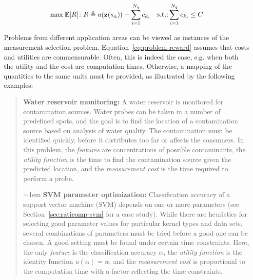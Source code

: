 \begin{equation}
\label{eq:problem-reward}
\mbox{max}\;\mathbb{E}[R]\colon R\triangleq u(\textbf{z}(s_\alpha))-\sum_{i=1}^{N_q}c_{k_i}\quad\mbox{s.t.:}\sum_{i=1}^{N_q}c_{k_i}\le C
\end{equation}

Problems from different application areas can be viewed as instances
of the measurement selection problem. Equation~\ref{eq:problem-reward} assumes
that costs and utilities are commensurable. Often, this is indeed the
case, e.g. when both the utility and the cost are computation
times. Otherwise, a mapping of the quantities to the same units must
be provided, as illustrated by the following examples:

\begin{quote}
{\bf Water reservoir monitoring:} A water reservoir is monitored for
contamination sources. Water probes can be taken in a number of
predefined spots, and the goal is to find the location of a
contamination source based on analysis of water quality. The
contamination must be identified quickly, before it distributes too
far or affects the consumers. In this problem, the {\em features} are
concentrations of possible contaminants, the {\em utility function} is
the time to find the contamination source given the predicted
location, and the {\em measurement cost} is the time required to
perform a probe.

\hangindent=1em
{\bf SVM parameter optimization:} Classification accuracy of a support
vector machine (SVM) depends on one or more parameters (see
Section~\ref{sec:raticomp-svm} for a case study). While there are heuristics
for selecting good parameter values for particular kernel types and
data sets, several combinations of parameters must be tried before a
good one can be chosen. A good setting must be found under certain time
constraints. Here, the only {\em feature} is the classification
accuracy $\alpha$, the {\em utility function} is the identity function
$u(\alpha)=\alpha$, and the {\em measurement cost} is proportional to
the computation time with a factor reflecting the time constraints.
\end{quote}

